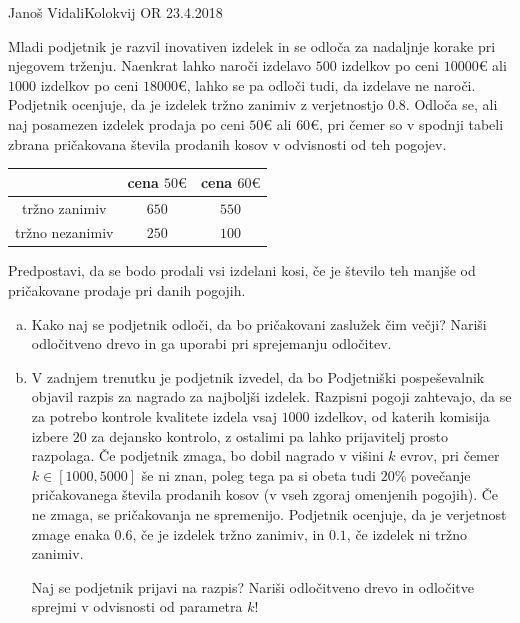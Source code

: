 \begin{naloga}{Janoš Vidali}{Kolokvij OR 23.4.2018}
\begin{vprasanje}
Mladi podjetnik je razvil inovativen izdelek
in se odloča za nadaljnje korake pri njegovem trženju.
Naenkrat lahko naroči izdelavo $500$ izdelkov po ceni $10000 €$
ali $1000$ izdelkov po ceni $18000 €$,
lahko se pa odloči tudi, da izdelave ne naroči.
Podjetnik ocenjuje, da je izdelek tržno zanimiv z verjetnostjo $0.8$.
Odloča se, ali naj posamezen izdelek prodaja po ceni $50 €$ ali $60 €$,
pri čemer so v spodnji tabeli zbrana pričakovana števila prodanih kosov
v odvisnosti od teh pogojev.

\begin{center}
\begin{tabular}{c|cc}
& cena $50 €$ & cena $60 €$ \\
\hline
tržno zanimiv & $650$ & $550$ \\
tržno nezanimiv & $250$ & $100$ \\
\end{tabular}
\end{center}

Predpostavi, da se bodo prodali vsi izdelani kosi,
če je število teh manjše od pričakovane prodaje pri danih pogojih.

\begin{enumerate}[(a)]
\item Kako naj se podjetnik odloči, da bo pričakovani zaslužek čim večji?
Nariši od\-lo\-čit\-ve\-no drevo in ga uporabi pri sprejemanju odločitev.

\item V zadnjem trenutku je podjetnik izvedel,
da bo Podjetniški pospeševalnik objavil
razpis za nagrado za najboljši izdelek.
Razpisni pogoji zahtevajo,
da se za potrebo kontrole kvalitete izdela vsaj $1000$ izdelkov,
od katerih komisija izbere $20$ za dejansko kontrolo,
z ostalimi pa lahko prijavitelj prosto razpolaga.
Če podjetnik zmaga, bo dobil nagrado v višini $k$ evrov,
pri čemer $k \in [1000, 5000]$ še ni znan,
poleg tega pa si obeta tudi $20\%$ povečanje
pričakovanega števila prodanih kosov (v vseh zgoraj omenjenih pogojih).
Če ne zmaga, se pričakovanja ne spremenijo.
Podjetnik ocenjuje, da je verjetnost zmage enaka $0.6$,
če je izdelek tržno zanimiv,
in $0.1$, če izdelek ni tržno zanimiv.

Naj se podjetnik prijavi na razpis?
Nariši odločitveno drevo in odločitve sprejmi v odvisnosti od parametra $k$!
\end{enumerate}
\end{vprasanje}
\begin{odgovor}
\end{odgovor}
\end{naloga}


